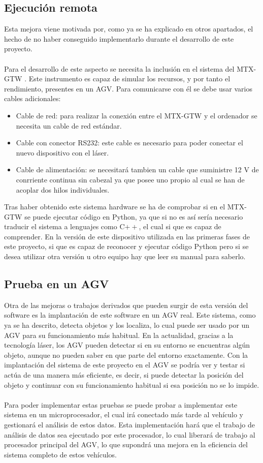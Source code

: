 \subsection{Ejecución remota}
Esta mejora viene motivada por, como ya se ha explicado en otros apartados, el hecho de no haber conseguido implementarlo durante el desarrollo de este proyecto.\\
\\
Para el desarrollo de este aspecto se necesita la inclusión en el sistema del MTX-GTW \cite{hardware MTX-GTW}. Este instrumento es capaz de simular los recursos, y por tanto el rendimiento, presentes en un AGV. Para comunicarse con él se debe usar varios cables adicionales:
\begin{itemize}
	\item Cable de red: para realizar la conexión entre el MTX-GTW y el ordenador se necesita un cable de red estándar.
	\item Cable con conector RS232: este cable es necesario para poder conectar el nuevo dispositivo con el láser.
	\item Cable de alimentación: se necesitará tambien un cable que suministre 12 V de conrriente continua sin cabezal ya que posee uno propio al cual se han de acoplar dos hilos individuales.
\end{itemize}
Tras haber obtenido este sistema hardware se ha de comprobar si en el MTX-GTW se puede ejecutar código en Python, ya que si no es así sería necesario traducir el sistema a lenguajes como C$++$, el cual si que es capaz de comprender. En la versión de este dispositivo utilizada en las primeras fases de este proyecto, si que es capaz de reconocer y ejecutar código Python pero si se desea utilizar otra versión u otro equipo hay que leer su manual para saberlo.

\subsection{Prueba en un AGV}

Otra de las mejoras o trabajos derivados que pueden surgir de esta versión del software es la implantación de este software en un AGV real. Este sistema, como ya se ha descrito, detecta objetos y los localiza, lo cual puede ser usado por un AGV para su funcionamiento más habitual. En la actualidad, gracias a la tecnología láser, los AGV pueden detectar si en su entorno se encuentras algún objeto, aunque no pueden saber en que parte del entorno exactamente. Con la implantación del sistema de este proyecto en el AGV se podría ver y testar si actúa de una manera más eficiente, es decir, si puede detectar la posición del objeto y continuar con su funcionamiento habitual si esa posición no se lo impide.\\
\\
Para poder implementar estas pruebas se puede probar a implementar este sistema en un microprocesador, el cual irá conectado más tarde al vehículo y gestionará el análisis de estos datos. Esta implementación hará que el trabajo de análisis de datos sea ejecutado por este procesador, lo cual liberará de trabajo al procesador principal del AGV, lo que supondrá una mejora en la eficiencia del sistema completo de estos vehículos.